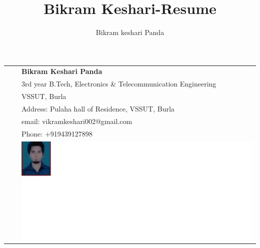 \documentclass{article}
\renewcommand{\maketitle}{
\begin{center}
{\Large\bfseries}
\end{center}
}
\begin{document}
\begin{tabular}{l  p{7.5 cm} p{10.5 cm} }
\centering
\multirow{7}{*}
 & &{\huge\bfseries Bikram Keshari Panda} \\
 & & 3rd year
  B.Tech, Electronics \& Telecommunication Engineering \\
 & & VSSUT, Burla \\
 & & Address: Pulaha hall of Residence, VSSUT, Burla\\
 & & email: vikramkeshari002@gmail.com \\
 & & Phone: $+$919439127898 \\
 & &{\includegraphics[scale=0.5]{Untitledpic.jpg}} \\
\end{tabular}\vspace{0.5 cm}
\title{Bikram Keshari-Resume}
\author{Bikram keshari Panda}
\maketitle\vspace{-4 em} \hrulefill
\end{document}

